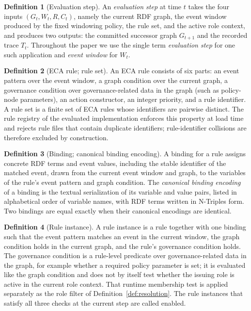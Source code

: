 \documentclass{ieeeaccess}
\theoremstyle{definition}
\newtheorem{definition}{Definition}
\theoremstyle{plain}
\theoremstyle{remark}
\begin{document}
\begin{definition}[Evaluation step]
\label{def:step}
An \emph{evaluation step} at time $t$ takes the four inputs $(G_t, W_t, R, C_t)$, namely the current RDF graph, the event window produced by the fixed windowing policy, the rule set, and the active role context, and produces two outputs: the committed successor graph $G_{t+1}$ and the recorded trace $T_t$. Throughout the paper we use the single term \emph{evaluation step} for one such application and \emph{event window} for $W_t$.
\end{definition}

\begin{definition}[ECA rule; rule set]
\label{def:rule}
An ECA rule consists of six parts: an event pattern over the event window, a graph condition over the current graph, a governance condition over governance-related data in the graph (such as policy-node parameters), an action constructor, an integer priority, and a rule identifier. A rule set is a finite set of ECA rules whose identifiers are pairwise distinct. The rule registry of the evaluated implementation enforces this property at load time and rejects rule files that contain duplicate identifiers; rule-identifier collisions are therefore excluded by construction.
\end{definition}

\begin{definition}[Binding; canonical binding encoding]
\label{def:binding}
A binding for a rule assigns concrete RDF terms and event values, including the stable identifier of the matched event, drawn from the current event window and graph, to the variables of the rule's event pattern and graph condition. The \emph{canonical binding encoding} of a binding is the textual serialization of its variable and value pairs, listed in alphabetical order of variable names, with RDF terms written in N-Triples form. Two bindings are equal exactly when their canonical encodings are identical.
\end{definition}

\begin{definition}[Rule instance]
\label{def:instance}
A rule instance is a rule together with one binding such that the event pattern matches an event in the current window, the graph condition holds in the current graph, and the rule's governance condition holds. The governance condition is a rule-level predicate over governance-related data in the graph, for example whether a required policy parameter is set; it is evaluated like the graph condition and does not by itself test whether the issuing role is active in the current role context. That runtime membership test is applied separately as the role filter of Definition~\ref{def:resolution}. The rule instances that satisfy all three checks at the current step are called enabled.
\end{definition}
\end{document}
